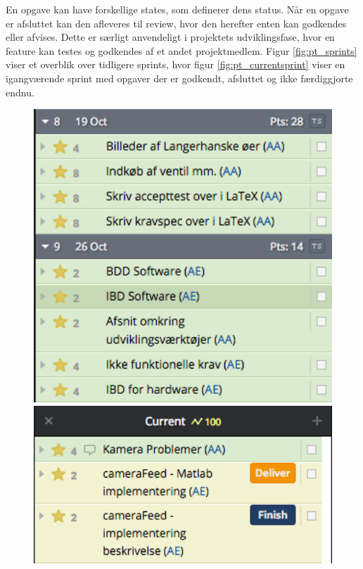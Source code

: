 En opgave kan have forskellige states, som definerer dens status. Når en opgave er afsluttet kan den afleveres til review, hvor den herefter enten kan godkendes eller afvises. Dette er særligt anvendeligt i projektets udviklingsfase, hvor en feature kan testes og godkendes af et andet projektmedlem. Figur \ref{fig:pt_sprints}  viser et overblik over tidligere sprints, hvor figur \ref{fig:pt_currentsprint} viser en igangværende sprint med opgaver der er godkendt, afsluttet og ikke færdiggjorte endnu.

\begin{figure}[htbp] \centering
\begin{minipage}[b]{0.48\textwidth} \centering
\includegraphics[width=1.00\textwidth]{billeder/pt_previous_sprints} %
\end{minipage} \hfill
\begin{minipage}[b]{0.48\textwidth} \centering
\includegraphics[width=1.00\textwidth]{billeder/pt_current_sprint} %

\end{minipage}
\end{figure}
